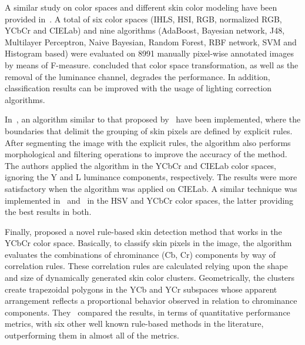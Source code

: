 A similar study on color spaces and different skin color modeling have been provided in~\citet{khan:12}. A total of six color spaces (IHLS, HSI, RGB, normalized RGB, YCbCr and CIELab) and nine algorithms (AdaBoost, Bayesian network, J48, Multilayer Perceptron, Naive Bayesian, Random Forest, RBF network, SVM and Histogram based) were evaluated on 8991 manually pixel-wise annotated images by means of F-measure. \citet{khan:12} concluded that color space transformation, as well as the removal of the luminance channel, degrades the performance. In addition, classification results can be improved with the usage of lighting correction algorithms.

In~\citet{kaur:12}, an algorithm similar to that proposed by~\citet{kovac:03} have been implemented, where the boundaries that delimit the grouping of skin pixels are defined by explicit rules. After segmenting the image with the explicit rules, the algorithm also performs morphological and filtering operations to improve the accuracy of the method. The authors applied the algorithm in the YCbCr and CIELab color spaces, ignoring the Y and L luminance components, respectively. The results were more satisfactory when the algorithm was applied on CIELab. A similar technique was implemented in~\citet{shaik:15} and~\citet{kumar:15} in the HSV and YCbCr color spaces, the latter providing the best results in both.

Finally, \citet{brancati:17} proposed a novel rule-based skin detection method that works in the YCbCr color space. Basically, to classify skin pixels in the image, the algorithm evaluates the combinations of chrominance (Cb, Cr) components by way of correlation rules. These correlation rules are calculated relying upon the shape and size of dynamically generated skin color clusters. Geometrically, the clusters create trapezoidal polygons in the YCb and YCr subspaces whose apparent arrangement reflects a proportional behavior observed in relation to chrominance components. They~\citep{brancati:17} compared the results, in terms of quantitative performance metrics, with six other well known rule-based methods in the literature, outperforming them in almost all of the metrics.